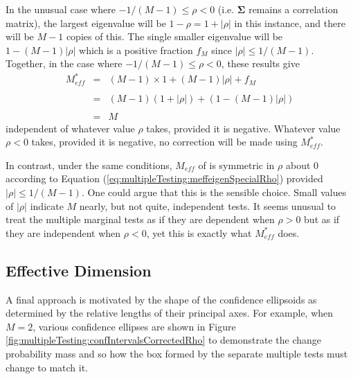\documentclass[letterpaper,12pt,oneside,final]{article}
\newcommand{\sm}[1]{\boldsymbol{#1}}   %
\newcommand{\abs}[1]{\lvert{#1}\rvert}              %
\newcommand{\comment}[1]{{\color{steelblue} COMMENT:  {#1}}}
\newcommand{\TODO}[1]{{\color{brickred} TODO:  {#1}}}
\begin{document}
In the unusual case where $-1/(M-1) \le \rho < 0$ (i.e. $\sm{\Sigma}$ remains a correlation matrix), the largest eigenvalue will be $1- \rho = 1 +\abs{\rho}$ in this instance, and there will be $M-1$ copies of this.
The single smaller eigenvalue will be $ 1 - (M-1)\abs{\rho}$ which is a positive fraction $f_M$ since $\abs{\rho} \le 1/(M-1)$.  Together, in the case where $-1/(M-1) \le \rho < 0$, these results give
\[
\begin{array}{rcl}
M_{eff}^* &=&  (M-1) \times 1 + (M-1) \abs{\rho} + f_M  \\
&&\\
&=&  (M-1)(1 + \abs{\rho}) + (1 - (M-1)\abs{\rho}) \\
&&\\
&=&  M
\end{array}
\]
independent of whatever value $\rho$ takes, provided it is negative.  Whatever value $\rho < 0$ takes, provided it is negative, no correction will be made using $M_{eff}^*$.  

In contrast, under the same conditions, $M_{eff}$ of \cite{cheverud2001} is symmetric in $\rho$ about $0$ according to Equation (\ref{eq:multipleTesting:meffeigenSpecialRho}) provided $\abs{\rho} \le 1/(M-1)$.   One could argue that this is the sensible choice.  Small values of $\abs{\rho}$ indicate $M$ nearly, but not quite,  independent tests.  It seems unusual to treat the multiple marginal tests as if they are dependent when $\rho >0$ but as if they are independent when $\rho < 0$, yet this is exactly what $M_{eff}^*$ does.





\subsection{Effective Dimension}

A final approach is motivated by the shape of the confidence ellipsoids as determined by the relative lengths of their principal axes. For example, when $M = 2$, various confidence ellipses are shown in Figure \ref{fig:multipleTesting:confIntervalsCorrectedRho} to demonstrate the change probability mass and so how the box formed by the separate multiple tests must change to match it.
\end{document}
